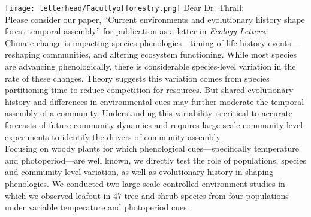 \documentclass[11pt,a4paper]{article}
\begin{document}

\noindent \texttt{[image: letterhead/Facultyofforestry.png]}
\noindent Dear Dr. Thrall:
\vspace{1.5ex}\\
\noindent Please consider our paper, ``Current environments and evolutionary history shape forest temporal assembly'' for publication as a letter in \emph{Ecology Letters}. 
\vspace{1.5ex}\\ 
\noindent Climate change is impacting species phenologies---timing of life history events---reshaping communities, and altering ecosystem functioning. While most species are advancing phenologically, there is considerable species-level variation in the rate of these changes. Theory suggests this variation comes from species partitioning time to reduce competition for resources. But shared evolutionary history and differences in environmental cues may further moderate the temporal assembly of a community. Understanding this variability is critical to accurate forecasts of future community dynamics and requires large-scale community-level experiments to identify the drivers of community assembly. %
\vspace{1.5ex}\\
\noindent Focusing on woody plants for which phenological cues---specifically temperature and photoperiod---are well known, we directly test the role of populations, species and community-level variation, as well as evolutionary history in shaping phenologies. We conducted two large-scale controlled environment studies in which we observed leafout in 47 tree and shrub species from four populations under variable temperature and photoperiod cues. 
\end{document}
